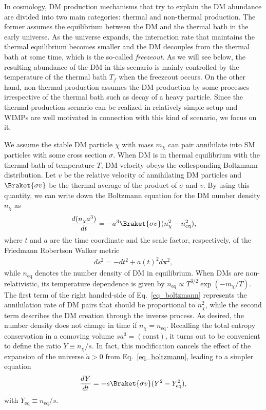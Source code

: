 \documentclass[12pt,twoside,book]{article}
\begin{document}
In cosmology, DM production mechanisms that try to explain the DM
abundance are divided into two main categories: thermal and non-thermal
production.  The former assumes the equilibrium between the DM and the
thermal bath in the early universe.  As the universe expands, the
interaction rate that maintains the thermal equilibrium becomes smaller
and the DM decouples from the thermal bath at some time, which is the
so-called \textit{freezeout}.  As we will see below, the resulting
abundance of the DM in this scenario is mainly controlled by the
temperature of the thermal bath $T_f$ when the freezeout occurs.  On the
other hand, non-thermal production assumes the DM production by some
processes irrespective of the thermal bath such as decay of a heavy
particle.  Since the thermal production scenario can be realized in
relatively simple setup and WIMPs are well motivated in connection with
this kind of scenario, we focus on it.

We assume the stable DM particle $\chi$ with mass $m_\chi$ can pair
annihilate into SM particles with some cross section $\sigma$.  When DM
is in thermal equilibrium with the thermal bath of temperature $T$, DM
velocity obeys the collesponding Boltzmann distribution.  Let $v$ be the
relative velocity of annihilating DM particles and $\Braket{\sigma v}$
be the thermal average of the product of $\sigma$ and $v$.  By using
this quantity, we can write down the Boltzmann equation for the DM
number density $n_\chi$ as
\begin{align}
 \frac{d (n_\chi a^3)}{d t} =
 - a^3 \Braket{\sigma v} (n_\chi^2 - n_{\mathrm{eq}}^2),\label{eq_boltzmann}
\end{align}
where $t$ and $a$ are the time coordinate and the scale factor,
respectively, of the Friedmann Robertson Walker metric
\begin{align}
 d s^2 = - d t^2 + a(t)^2 d \bm{x}^2,
\end{align}
while $n_{\mathrm{eq}}$ denotes the number density of DM in equilibrium.
When DMs are non-relativistic, its temperature dependence is given by
$n_{\mathrm{eq}} \propto T^{3/2} \exp \left( -m_\chi / T \right)$.  The
first term of the right handed-side of Eq.~\eqref{eq_boltzmann}
represents the annihilation rate of DM pairs that should be proportional
to $n_\chi^2$, while the second term describes the DM creation through
the inverse process.  As desired, the number density does not change in
time if $n_\chi = n_{\mathrm{eq}}$.  Recalling the total entropy
conservation in a comoving volume $s a^3 = (\mathrm{const})$, it turns
out to be convenient to define the ratio $Y \equiv n_\chi / s$.  In
fact, this modification cancels the effect of the expansion of the
universe $\dot{a} > 0$ from Eq.~\eqref{eq_boltzmann}, leading to a
simpler equation
\begin{align}
 \frac{d Y}{d t} =
 -s \Braket{\sigma v} (Y^2 - Y_{\mathrm{eq}}^2),\label{eq_boltzmann_Yt}
\end{align}
with $Y_{\mathrm{eq}} \equiv n_{\mathrm{eq}} / s$.
\end{document}

